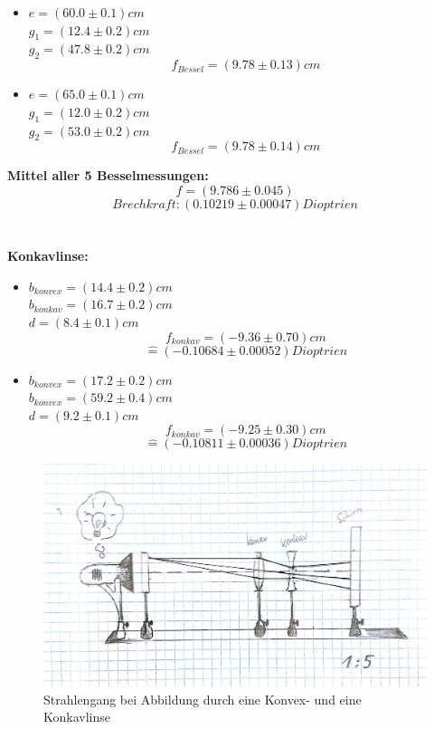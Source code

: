 \documentclass[12pt,a4paper]{article}
\begin{document}
\begin{multicols}{2}
\begin{itemize}
	\item $e=(60.0 \pm 0.1)cm$\\
	\indent $g_1= (12.4 \pm 0.2) cm$\\
	$g_2 = (47.8 \pm 0.2)cm$
	$$f_{Bessel}=(9.78 \pm 0.13) cm$$
	
	\item $e=(65.0 \pm 0.1)cm$\\
	\indent $g_1 = (12.0 \pm 0.2) cm$\\
	$g_2 =(53.0 \pm 0.2)cm$
	$$f_{Bessel} = (9.78 \pm 0.14)cm$$

\end{itemize}

\textbf{Mittel aller 5 Besselmessungen:}\\
$$f=(9.786 \pm 0.045)$$
$$Brechkraft: (0.10219 \pm 0.00047) Dioptrien$$\\
\\
\textbf{Konkavlinse:}
\begin{itemize}
	\item $b_{konvex}=(14.4 \pm 0.2) cm$\\
	$b_{konkav}=(16.7 \pm 0.2)cm$\\
	$d=(8.4 \pm 0.1)cm$
	$$f_{konkav}= (-9.36 \pm 0.70)cm$$
	$$\widehat{=}(-0.10684 \pm 0.00052)Dioptrien$$
	
	\item $b_{konvex}=(17.2 \pm 0.2)cm$\\
	$b_{konvex}=(59.2 \pm 0.4)cm$\\
	$d=(9.2 \pm 0.1)cm$
	$$f_{konkav}= (-9.25 \pm 0.30)cm$$
	$$\widehat{=}(-0.10811 \pm 0.00036)Dioptrien$$
	
	
\end{itemize}


\end{multicols}

\begin{figure}[H]
	\centering
	\includegraphics[scale=0.36]{./Bilder/strahlengang_konvex-konkav.png}
	\caption{Strahlengang bei Abbildung durch eine Konvex- und eine Konkavlinse}
	\label{fig:strahlengang_konvex-konkav}
\end{figure}
\end{document}

